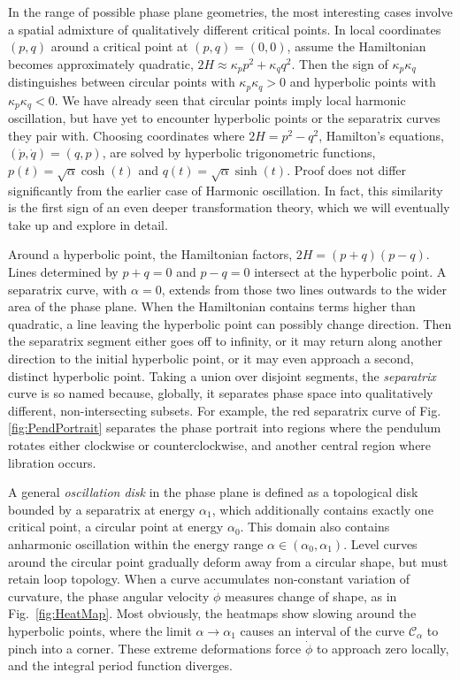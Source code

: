 \documentclass[nofootinbib,preprint]{revtex4-1}
\begin{document}
In the range of possible phase plane geometries, the most interesting cases involve a spatial
admixture of qualitatively different critical points. In local coordinates $(p,q)$ around a 
critical point at ${(p,q)=(0,0)}$, assume the Hamiltonian becomes approximately quadratic, 
${2H\approx \kappa_p p^2+\kappa_q q^2}$. Then the sign of $\kappa_p\kappa_q$ distinguishes between 
circular points with $\kappa_p\kappa_q>0$ and hyperbolic points with $\kappa_p\kappa_q < 0$.
We have already seen that circular points imply local harmonic oscillation, but have yet
to encounter hyperbolic points or the separatrix curves they pair with. Choosing coordinates 
where $2H=p^2-q^2$, Hamilton's equations, $(\dot{p},\dot{q})=(q,p)$, 
are solved by hyperbolic trigonometric functions, ${p(t) = \sqrt{\alpha}\cosh(t)}$ and 
${q(t) = \sqrt{\alpha}\sinh(t)}$. Proof does not differ significantly from the earlier case 
of Harmonic oscillation. In fact, this similarity is the first sign of an even deeper 
transformation theory, which we will eventually take up and explore in detail.

Around a hyperbolic point, the Hamiltonian factors, $2H=(p+q)(p-q)$. Lines determined
by $p+q=0$ and $p-q=0$ intersect at the hyperbolic point. A separatrix curve, with $\alpha=0$, 
extends from those two lines outwards to the wider area of the phase plane. When the Hamiltonian 
contains terms higher than quadratic, a line leaving the hyperbolic point can possibly change 
direction. Then the separatrix segment either goes off to infinity, or it may return along 
another direction to the initial hyperbolic point, or it may even approach a second, distinct 
hyperbolic point. Taking a union over disjoint segments, the \textit{separatrix} curve is so 
named because, globally, it separates phase space into qualitatively different, non-intersecting 
subsets. For example, the red separatrix curve of Fig. \ref{fig:PendPortrait} separates the phase 
portrait into regions where the pendulum rotates either clockwise or counterclockwise, and another 
central region where libration occurs. 

A general \textit{oscillation disk} in the phase plane is defined as a topological disk bounded by 
a separatrix at energy $\alpha_1$, which additionally contains exactly one critical point, 
a circular point at energy $\alpha_0$. This domain also contains anharmonic oscillation within the energy range 
$\alpha \in (\alpha_0 , \alpha_1)$. Level curves around the circular point gradually deform away from a circular 
shape, but must retain loop topology. When a curve accumulates non-constant variation of curvature, 
the phase angular velocity $\dot{\phi}$ measures change of shape, as in Fig.~\ref{fig:HeatMap}. 
Most obviously, the heatmaps show slowing around the hyperbolic points, where the limit 
$\alpha \rightarrow \alpha_1$ causes an interval of the curve $\mathcal{C}_{\alpha}$ to pinch into a corner. 
These extreme deformations force $\dot{\phi}$ to approach zero locally, and the integral period
function diverges. 
\end{document}
